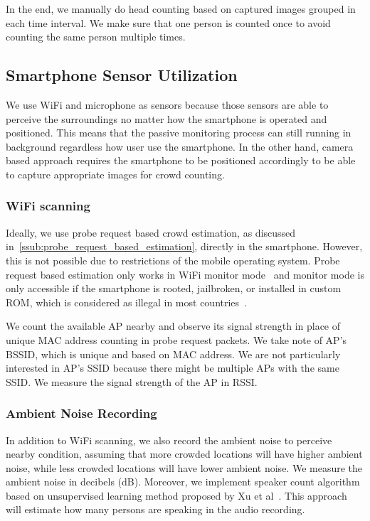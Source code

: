 	In the end, we manually do head counting based on captured images grouped in each time interval. We make sure that one person is counted once to avoid counting the same person multiple times.

\subsection{Smartphone Sensor Utilization} %
\label{sub:smartphone_sensor_utilization}
We use WiFi and microphone as sensors because those sensors are able to perceive the surroundings no matter how the smartphone is operated and positioned. This means that the passive monitoring process can still running in background regardless how user use the smartphone. In the other hand, camera based approach requires the smartphone to be positioned accordingly to be able to capture appropriate images for crowd counting.

	\subsubsection{WiFi scanning} %
	\label{ssub:wifi_scanning}
	Ideally, we use probe request based crowd estimation, as discussed in~\autoref{ssub:probe_request_based_estimation}, directly in the smartphone. However, this is not possible due to restrictions of the mobile operating system. Probe request based estimation only works in WiFi monitor mode~\cite{thesis052,thesis079} and monitor mode is only accessible if the smartphone is rooted, jailbroken, or installed in custom \ac{ROM}, which is considered as illegal in most countries~\cite{rootjailbreak}.
	
	We count the available \ac{AP} nearby and observe its signal strength in place of unique \ac{MAC} address counting in probe request packets. We take note of \ac{AP}'s \ac{BSSID}, which is unique and based on \ac{MAC} address. We are not particularly interested in \ac{AP}'s \ac{SSID} because there might be multiple \ac{AP}s with the same \ac{SSID}. We measure the signal strength of the \ac{AP} in \ac{RSSI}.

	\subsubsection{Ambient Noise Recording} %
	\label{ssub:ambient_noise_recording}
	In addition to WiFi scanning, we also record the ambient noise to perceive nearby condition, assuming that more crowded locations will have higher ambient noise, while less crowded locations will have lower ambient noise. We measure the ambient noise in decibels (dB). Moreover, we implement speaker count algorithm based on unsupervised learning method proposed by Xu et al~\cite{thesis067}. This approach will estimate how many persons are speaking in the audio recording.

